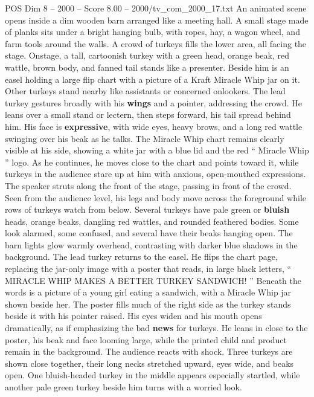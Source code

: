 \begin{textsample}{POS Dim 8 – 2000 – Score 8.00 – 2000/tv\_com\_2000\_17.txt}  \label{ex:f8_pos_010}
An animated scene opens inside a dim wooden barn arranged like a meeting hall.
A small stage made of planks sits under a bright hanging bulb, with ropes, hay, a wagon wheel, and farm tools around the walls.
A crowd of turkeys fills the lower area, all facing the stage.
Onstage, a tall, cartoonish turkey with a green head, orange beak, red wattle, brown body, and fanned tail stands like a presenter.
Beside him is an easel holding a large flip chart with a picture of a Kraft Miracle Whip jar on it.
Other turkeys stand nearby like assistants or concerned onlookers.
The lead turkey gestures broadly with his \textbf{wings} and a pointer, addressing the crowd.
He leans over a small stand or lectern, then steps forward, his tail spread behind him.
His face is \textbf{expressive}, with wide eyes, heavy brows, and a long red wattle swinging over his beak as he talks.
The Miracle Whip chart remains clearly visible at his side, showing a white jar with a blue lid and the red “ Miracle Whip ” logo.
As he continues, he moves close to the chart and points toward it, while turkeys in the audience stare up at him with anxious, open-mouthed expressions.
The speaker struts along the front of the stage, passing in front of the crowd.
Seen from the audience level, his legs and body move across the foreground while rows of turkeys watch from below.
Several turkeys have pale green or \textbf{bluish} heads, orange beaks, dangling red wattles, and rounded feathered bodies.
Some look alarmed, some confused, and several have their beaks hanging open.
The barn lights glow warmly overhead, contrasting with darker blue shadows in the background.
The lead turkey returns to the easel.
He flips the chart page, replacing the jar-only image with a poster that reads, in large black letters, “ MIRACLE WHIP MAKES A BETTER TURKEY SANDWICH! ” Beneath the words is a picture of a young girl eating a sandwich, with a Miracle Whip jar shown beside her.
The poster fills much of the right side as the turkey stands beside it with his pointer raised.
His eyes widen and his mouth opens dramatically, as if emphasizing the bad \textbf{news} for turkeys.
He leans in close to the poster, his beak and face looming large, while the printed child and product remain in the background.
The audience reacts with shock.
Three turkeys are shown close together, their long necks stretched upward, eyes wide, and beaks open.
One bluish-headed turkey in the middle appears especially startled, while another pale green turkey beside him turns with a worried look.

\end{textsample}
